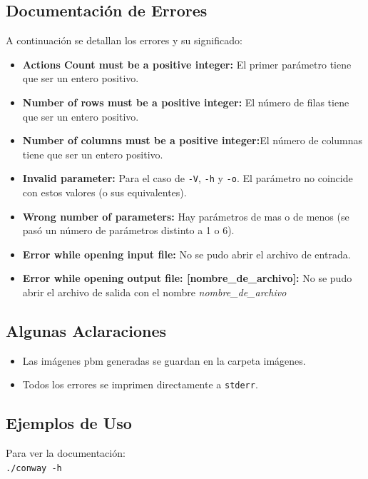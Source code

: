 \documentclass[11pt,a4paper]{article}
\begin{document}
\subsection{Documentación de Errores}
A continuación se detallan los errores y su significado:
\begin{itemize}
	\item \textbf{Actions Count must be a positive integer:} El primer parámetro tiene que ser un entero positivo.
	\item \textbf{Number of rows must be a positive integer:} El número de filas tiene que ser un entero positivo.
	\item \textbf{Number of columns must be a positive integer:}El número de columnas tiene que ser un entero positivo.
	\item \textbf{Invalid parameter:} Para el caso de \texttt{-V}, \texttt{-h} y \texttt{-o}. El parámetro no coincide con estos valores (o sus equivalentes).
	\item \textbf{Wrong number of parameters:} Hay parámetros de mas o de menos (se pasó un número de parámetros distinto a 1 o 6).
	\item \textbf{Error while opening input file:} No se pudo abrir el archivo de entrada.
	\item \textbf{Error while opening output file: [nombre\_de\_archivo]:} No se pudo abrir el archivo de salida con el nombre \emph{nombre\_de\_archivo}
\end{itemize}

\subsection{Algunas Aclaraciones}
\begin{itemize}
	\item Las imágenes pbm generadas se guardan en la carpeta imágenes.
	\item Todos los errores se imprimen directamente a \texttt{stderr}.
	
\end{itemize}

\subsection{Ejemplos de Uso}

Para ver la documentación:\\

\texttt{./conway -h}\\
\end{document}
